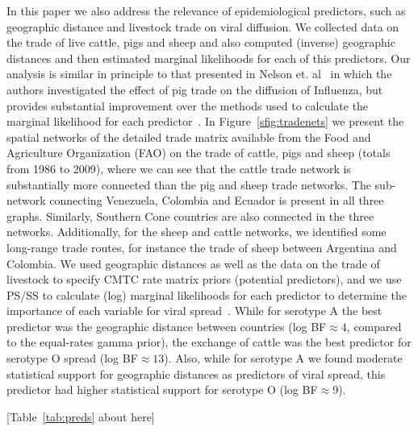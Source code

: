 \documentclass[10pt]{article}
\begin{document}
In this paper we also address the relevance of epidemiological predictors, such as geographic distance and livestock trade on viral diffusion.
We collected data on the trade of live cattle, pigs and sheep and also computed (inverse) geographic distances and then estimated marginal likelihoods  for each of this predictors.
Our analysis is similar in principle to that presented in Nelson et. al~\cite{Nelson2011} in which the authors investigated the effect of pig trade on the diffusion of Influenza, but provides substantial improvement over the methods used to calculate the marginal likelihood for each predictor~\cite{Baele2012}.
In Figure~\ref{sfig:tradenets} we present the spatial networks of the detailed trade matrix available from the Food and Agriculture Organization (FAO) on the trade of cattle, pigs and sheep (totals from 1986 to 2009), where we can see that the cattle trade network is substantially more connected than the pig and sheep trade networks.
The sub-network connecting Venezuela, Colombia and Ecuador is present in all three graphs.
Similarly, Southern Cone countries are also connected in the three networks.
Additionally, for the sheep and cattle networks, we identified some long-range trade routes, for instance the trade of sheep between Argentina and Colombia.
We used geographic distances as well as the data on the trade of livestock to specify CMTC rate matrix priors (potential predictors), and we use PS/SS to calculate (log) marginal likelihoods for each predictor to determine the importance of each variable for viral spread~\cite{Carvalho2013, Nelson2011}.
While for serotype A the best predictor was the geographic distance between countries (log BF$\approx 4$, compared to the equal-rates gamma prior), the exchange of cattle was the best predictor for serotype O spread (log BF$\approx 13$). 
Also, while for serotype A we found moderate statistical support for geographic distances as predictors of viral spread, this predictor had higher statistical support for serotype O (log BF$\approx 9$).

\begin{center}
 [Table~\ref{tab:preds} about here]
\end{center}
\end{document}
